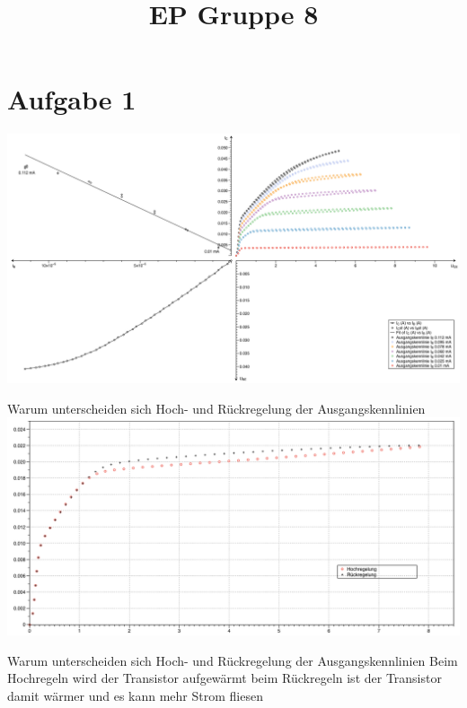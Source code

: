 \documentclass[compress,11pt]{beamer}
\title{EP Gruppe 8}
\begin{document}
\section{Aufgabe 1}
\begin{frame}
\includegraphics[width=1.1\textwidth]{kennlinienfeld.png}
\end{frame}
\begin{frame}
\begin{block}{Warum unterscheiden sich Hoch- und Rückregelung der Ausgangskennlinien }
\includegraphics[width=\textwidth]{hinruck.png}
\end{block}
\end{frame}
\begin{frame}
\begin{block}{Warum unterscheiden sich Hoch- und Rückregelung der Ausgangskennlinien }
Beim Hochregeln wird der Transistor aufgewärmt beim Rückregeln ist der Transistor damit wärmer und es kann mehr Strom fliesen
\end{block}
\end{frame}
\end{document}
